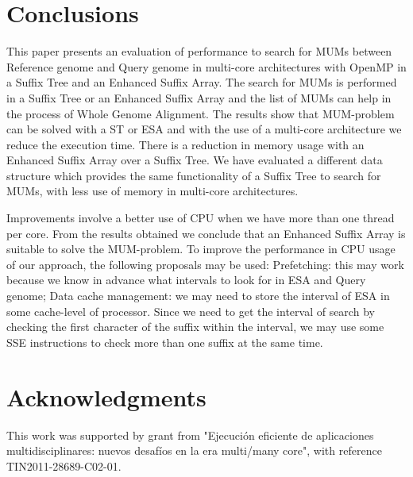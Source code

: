 \documentclass[runningheads,a4paper]{llncs}
\begin{document}
\section{Conclusions}
This paper presents an evaluation of performance to search for MUMs between Reference genome and Query genome in multi-core architectures with OpenMP in a Suffix Tree and an Enhanced Suffix Array. The search for MUMs is performed in a Suffix Tree or an Enhanced Suffix Array and the list of MUMs can help in the process of Whole Genome Alignment. The results show that MUM-problem can be solved with a ST or ESA and with the use of a multi-core architecture we reduce the execution time. There is a reduction in memory usage with an Enhanced Suffix Array over a Suffix Tree. We have evaluated a different data structure which provides the same functionality of a Suffix Tree to search for MUMs, with less use of memory in multi-core architectures.

Improvements involve a better use of CPU when we have more than one thread per core. From the results obtained we conclude that an Enhanced Suffix Array is suitable to solve the MUM-problem. To improve the performance in CPU usage of our approach, the following proposals may be used: Prefetching: this may work because we know in advance what intervals to look for in ESA and Query genome; Data cache management: we may need to store the interval of ESA in some cache-level of processor. Since we need to get the interval of search by checking the first character of the suffix within the interval, we may use some SSE instructions to check more than one suffix at the same time.
\section{Acknowledgments}
This work was supported by grant from "Ejecuci\'on eficiente de aplicaciones multidisciplinares: nuevos desaf\'ios en la era multi/many core", with reference TIN2011-28689-C02-01.

  
\end{document}

